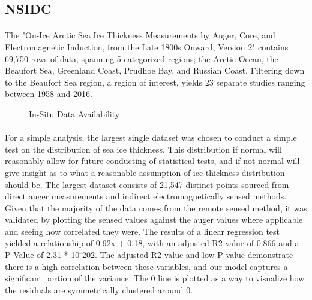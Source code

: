 
\subsection*{NSIDC}
\paragraph*{}
The "On-Ice Arctic Sea Ice Thickness Measurements by Auger, Core, and Electromagnetic Induction, from the Late 1800s Onward, Version 2" contains 69,750 rows of data, spanning 5 categorized regions; the Arctic Ocean, the Beaufort Sea, Greenland Coast, Prudhoe Bay, and Russian Coast. Filtering down to the Beaufort Sea region, a region of interest, yields 23 separate studies ranging between 1958 and 2016.
\par
\begin{figure}[htb]
	\centering
	\caption{In-Situ Data Availability}
	\label{fig:foobar}
\end{figure}


\paragraph*{}
For a simple analysis, the largest single dataset was chosen to conduct a simple test on the distribution of sea ice thickness. This distribution if normal will reasonably allow for future conducting of statistical tests, and if not normal will give insight as to what a reasonable assumption of ice thickness distribution should be. The largest dataset consists of 21,547 distinct points sourced from direct auger measurements and indirect electromagnetically sensed methods. Given that the majority of the data comes from the remote sensed method, it was validated by plotting the sensed values against the auger values where applicable and seeing how correlated they were. The results of a linear regression test yielded a relationship of 0.92x + 0.18, with an adjusted R\^2 value of 0.866 and a P Value of 2.31 * 10\^-202. The adjusted R\^2 value and low P value demonstrate there is a high correlation between these variables, and our model captures a significant portion of the variance. The 0 line is plotted as a way to visualize how the residuals are symmetrically clustered around 0.
\par

